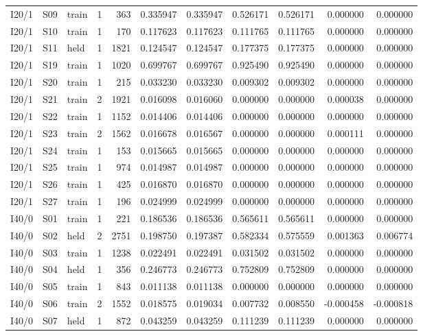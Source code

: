 {\begin{longtable}{@{}lllrrrrrrrr@{}}
I20/1 & S09 & train & 1 & 363 & 0.335947 & 0.335947 & 0.526171 & 0.526171 & 0.000000 & 0.000000 \\
I20/1 & S10 & train & 1 & 170 & 0.117623 & 0.117623 & 0.111765 & 0.111765 & 0.000000 & 0.000000 \\
I20/1 & S11 & held & 1 & 1821 & 0.124547 & 0.124547 & 0.177375 & 0.177375 & 0.000000 & 0.000000 \\
I20/1 & S19 & train & 1 & 1020 & 0.699767 & 0.699767 & 0.925490 & 0.925490 & 0.000000 & 0.000000 \\
I20/1 & S20 & train & 1 & 215 & 0.033230 & 0.033230 & 0.009302 & 0.009302 & 0.000000 & 0.000000 \\
I20/1 & S21 & train & 2 & 1921 & 0.016098 & 0.016060 & 0.000000 & 0.000000 & 0.000038 & 0.000000 \\
I20/1 & S22 & train & 1 & 1152 & 0.014406 & 0.014406 & 0.000000 & 0.000000 & 0.000000 & 0.000000 \\
I20/1 & S23 & train & 2 & 1562 & 0.016678 & 0.016567 & 0.000000 & 0.000000 & 0.000111 & 0.000000 \\
I20/1 & S24 & train & 1 & 153 & 0.015665 & 0.015665 & 0.000000 & 0.000000 & 0.000000 & 0.000000 \\
I20/1 & S25 & train & 1 & 974 & 0.014987 & 0.014987 & 0.000000 & 0.000000 & 0.000000 & 0.000000 \\
I20/1 & S26 & train & 1 & 425 & 0.016870 & 0.016870 & 0.000000 & 0.000000 & 0.000000 & 0.000000 \\
I20/1 & S27 & train & 1 & 196 & 0.024999 & 0.024999 & 0.000000 & 0.000000 & 0.000000 & 0.000000 \\
I40/0 & S01 & train & 1 & 221 & 0.186536 & 0.186536 & 0.565611 & 0.565611 & 0.000000 & 0.000000 \\
I40/0 & S02 & held & 2 & 2751 & 0.198750 & 0.197387 & 0.582334 & 0.575559 & 0.001363 & 0.006774 \\
I40/0 & S03 & train & 1 & 1238 & 0.022491 & 0.022491 & 0.031502 & 0.031502 & 0.000000 & 0.000000 \\
I40/0 & S04 & held & 1 & 356 & 0.246773 & 0.246773 & 0.752809 & 0.752809 & 0.000000 & 0.000000 \\
I40/0 & S05 & train & 1 & 843 & 0.011138 & 0.011138 & 0.000000 & 0.000000 & 0.000000 & 0.000000 \\
I40/0 & S06 & train & 2 & 1552 & 0.018575 & 0.019034 & 0.007732 & 0.008550 & -0.000458 & -0.000818 \\
I40/0 & S07 & held & 1 & 872 & 0.043259 & 0.043259 & 0.111239 & 0.111239 & 0.000000 & 0.000000 \\

\end{longtable}}
